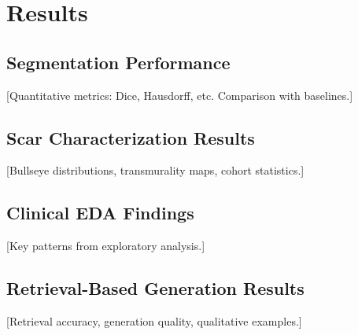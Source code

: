 \chapter{Results}

\section{Segmentation Performance}
[Quantitative metrics: Dice, Hausdorff, etc. Comparison with baselines.]

\section{Scar Characterization Results}
[Bullseye distributions, transmurality maps, cohort statistics.]

\section{Clinical EDA Findings}
[Key patterns from exploratory analysis.]

\section{Retrieval-Based Generation Results}
[Retrieval accuracy, generation quality, qualitative examples.]
